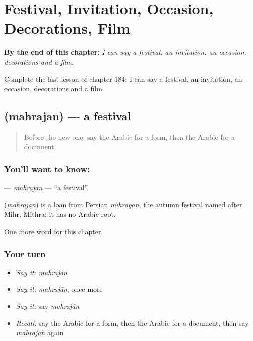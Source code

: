 
\chapter{Festival, Invitation, Occasion, Decorations, Film}
\label{ch:ar-festival-invitation-occasion-decorations-film}

\begin{chapteropening}
\textbf{By the end of this chapter:} \emph{I can say a festival, an invitation, an occasion, decorations and a film.}

Complete the last lesson of chapter 184: I can say a festival, an invitation, an occasion, decorations and a film.
\end{chapteropening}

\section[\texorpdfstring{\ar{مهرجان} (mahrajān)}{مهرجان (mahrajān)}]{ (mahrajān) — a festival}

\label{lesson:AR-C184-mahrajan}



\begin{quote}
Before the new one: say the Arabic for a form, then the Arabic for a document.
\end{quote}

\subsection*{You'll want to know: }
\textbf{} — \emph{mahrajān} — \textquotedblleft{}a festival\textquotedblright{}.

\begin{cousinweb}
\textbf{} (\emph{mahrajān}) is a loan from Persian \emph{mihragān}, the autumn festival named after Mihr, Mithra; it has no Arabic root.
\end{cousinweb}

\begin{grammarlens}[title={What you've built}]
One more word for this chapter.
\end{grammarlens}

\subsection*{Your turn}
\begin{itemize}
\raggedright
  \item \emph{Say it:} \emph{mahrajān}
  \item \emph{Say it:} \emph{mahrajān}, once more
  \item \emph{Say it:} say \emph{mahrajān}
  \item \emph{Recall:} say the Arabic for a form, then the Arabic for a document, then say \emph{mahrajān} again
\end{itemize}

